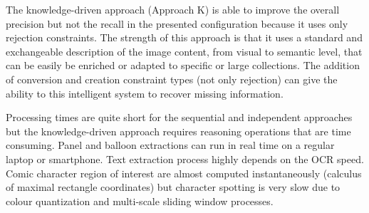 The knowledge-driven approach (Approach K) is able to improve the overall precision but not the recall in the presented configuration because it uses only rejection constraints.
The strength of this approach is that it uses a standard and exchangeable description of the image content, from visual to semantic level, that can be easily be enriched or adapted to specific or large collections.
The addition of conversion and creation constraint types (not only rejection) can give the ability to this intelligent system to recover missing information.

Processing times are quite short for the sequential and independent approaches but the knowledge-driven approach requires reasoning operations that are time consuming.
Panel and balloon extractions can run in real time on a regular laptop or smartphone.
Text extraction process highly depends on the OCR speed.
Comic character region of interest are almost computed instantaneously (calculus of maximal rectangle coordinates) but character spotting is very slow due to colour quantization and multi-scale sliding window processes.


